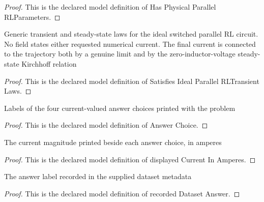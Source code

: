 \begin{proof}
  This is the declared model definition of Has Physical Parallel RLParameters.
\end{proof}
\begin{definition}
  \label{def:physics:phyx-mini-0984:phyxminiproblems-problemphyxmini0984-satisfiesidealparallelrltransientlaws}
  Generic transient and steady-state laws for the ideal switched parallel RL circuit. No field states either requested numerical current. The final current is connected to the trajectory both by a genuine limit and by the zero-inductor-voltage steady-state Kirchhoff relation
\end{definition}
\begin{proof}
  This is the declared model definition of Satisfies Ideal Parallel RLTransient Laws.
\end{proof}
\begin{definition}
  \label{def:physics:phyx-mini-0984:phyxminiproblems-problemphyxmini0984-answerchoice}
  Labels of the four current-valued answer choices printed with the problem
\end{definition}
\begin{proof}
  This is the declared model definition of Answer Choice.
\end{proof}
\begin{definition}
  \label{def:physics:phyx-mini-0984:phyxminiproblems-problemphyxmini0984-answerchoice-displayedcurrentinamperes}
  The current magnitude printed beside each answer choice, in amperes
\end{definition}
\begin{proof}
  This is the declared model definition of displayed Current In Amperes.
\end{proof}
\begin{definition}
  \label{def:physics:phyx-mini-0984:phyxminiproblems-problemphyxmini0984-recordeddatasetanswer}
  The answer label recorded in the supplied dataset metadata
\end{definition}
\begin{proof}
  This is the declared model definition of recorded Dataset Answer.
\end{proof}
